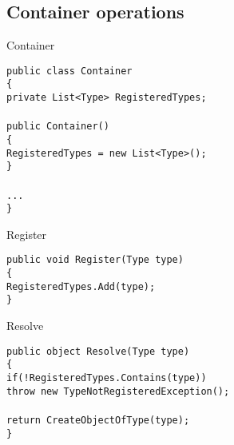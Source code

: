 \documentclass{beamer}
\newcommand{\code}[1]{{\texttt{#1}}}
\begin{document}
\subsection*{Container operations}

\begin{frame}{Container}
     \begin{large}
	\code{public class Container}\\
	\code{\{}\\ \quad
		\code{private List<Type> RegisteredTypes;}\\ \quad
		\code{}\\ \quad
		\code{public Container()}\\ \quad
		\code{\{}\\ \qquad
		\code{RegisteredTypes = new List<Type>();}\\ \quad
		\code{\}}\\  \quad
		\code{}\\ \quad
		\code{...}\\
	\code{\}}
     \end{large}
\end{frame}

\begin{frame}{Register}
     \begin{large}
	\code{public void Register(Type type)}\\
	\code{\{}\\ \quad
		\code{RegisteredTypes.Add(type);}\\
	\code{\}}
     \end{large}
\end{frame}

\begin{frame}{Resolve}
     \begin{large}
	\code{public object Resolve(Type type)}\\
	\code{\{}\\ \quad
		\code{if(!RegisteredTypes.Contains(type))}\\ \qquad
		\code{throw new TypeNotRegisteredException();}\\ \quad
		\code{}\\ \quad
		\code{return CreateObjectOfType(type);}\\
	\code{\}}
     \end{large}
\end{frame}
\end{document}
